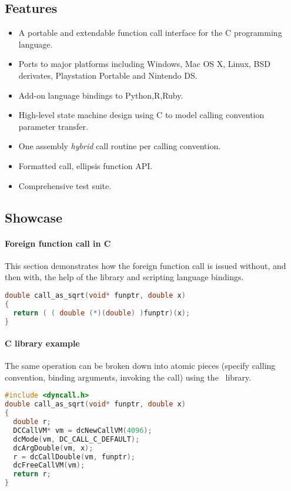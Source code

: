 \subsection{Features}

\begin{itemize}
\item A portable and extendable function call interface for the C programming 
language.
\item Ports to major platforms including Windows, Mac OS X, Linux, BSD derivates, Playstation Portable and Nintendo DS.
\item Add-on language bindings to Python,R,Ruby.
\item High-level state machine design using C to model calling convention
parameter transfer.
\item One assembly \emph{hybrid} call routine per calling convention.
\item Formatted call, ellipsis function API.
\item Comprehensive test suite.
\end{itemize}

\pagebreak

\subsection{Showcase}

\paragraph{Foreign function call in C}
This section demonstrates how the foreign function call is issued without, and then 
with, the help of the  library and scripting language
bindings.

\begin{lstlisting}[language=c,caption=Foreign function call in C]
double call_as_sqrt(void* funptr, double x)
{
  return ( ( double (*)(double) )funptr)(x);
}
\end{lstlisting}

\paragraph{ C library example}

The same operation can be broken down into atomic pieces 
(specify calling convention, binding arguments, invoking the call)
using the \dc\ library.

\begin{lstlisting}[language=c,caption=Dyncall C library example]
#include <dyncall.h>
double call_as_sqrt(void* funptr, double x)
{
  double r;
  DCCallVM* vm = dcNewCallVM(4096);
  dcMode(vm, DC_CALL_C_DEFAULT);
  dcArgDouble(vm, x);  
  r = dcCallDouble(vm, funptr);
  dcFreeCallVM(vm);
  return r;
}
\end{lstlisting}

